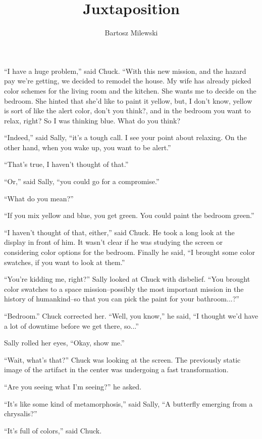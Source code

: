 \documentclass{memoir}
\author{Bartosz Milewski}
\title{Juxtaposition}
\date{}
\begin{document}
\maketitle{}


``I have a huge problem,'' said Chuck. ``With this new mission, and the hazard pay we're getting, we decided to remodel the house. My wife has already picked color schemes for the living room and the kitchen. She wants me to decide on the bedroom. She hinted that she'd like to paint it yellow, but, I don't know, yellow is sort of like the alert color, don't you think?, and in the bedroom you want to relax, right? So I was thinking blue. What do you think?

``Indeed,'' said Sally, ``it's a tough call. I see your point about relaxing. On the other hand, when you wake up, you want to be alert.''

``That's true, I haven't thought of that.''

``Or,'' said Sally, ``you could go for a compromise.''

``What do you mean?''

``If you mix yellow and blue, you get green. You could paint the bedroom green.''

``I haven't thought of that, either,'' said Chuck. He took a long look at the display in front of him. It wasn't clear if he was studying the screen or considering color options for the bedroom. Finally he said, ``I brought some color swatches, if you want to look at them.''

``You're kidding me, right?'' Sally looked at Chuck with disbelief. ``You brought color swatches to a space mission--possibly the most important mission in the history of humankind--so that you can pick the paint for your bathroom...?''

``Bedroom.'' Chuck corrected her. ``Well, you know,'' he said, ``I thought we'd have a lot of downtime before we get there, so...''

Sally rolled her eyes, ``Okay, show me.''

``Wait, what's that?'' Chuck was looking at the screen. The previously static image of the artifact in the center was undergoing a fast transformation. 

``Are you seeing what I'm seeing?'' he asked.

``It's like some kind of metamorphosis,'' said Sally, ``A butterfly emerging from a chrysalis?''

``It's full of colors,'' said Chuck. 
\end{document}
